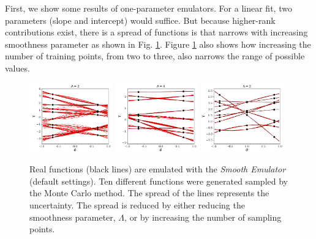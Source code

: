 \documentclass[UserManual.tex]{subfiles}
\begin{document}
First, we show some results of one-parameter emulators. For a linear fit, two parameters (slope and intercept) would suffice. But because higher-rank contributions exist, there is a spread of functions is that narrows with increasing smoothness parameter as shown in Fig. \ref{fig:onedim}. Figure \ref{fig:onedim} also shows how increasing the number of training points, from two to three, also narrows the range of possible values. 
\begin{figure}
\includegraphics[width=0.32\textwidth]{onepar2points/onepartest_Lambda2}\hspace*{0.02\textwidth}
\includegraphics[width=0.32\textwidth]{onepar2points/onepartest_Lambda4}\hspace*{0.02\textwidth}
\includegraphics[width=0.32\textwidth]{onepar3points/onepartest_Lambda2}
\caption{\label{fig:onedim}
Real functions (black lines) are emulated with the {\it Smooth Emulator} (default settings). Ten different functions were generated sampled by the Monte Carlo method. The spread of the lines represents the uncertainty. The spread is reduced by either reducing the smoothness parameter, $\Lambda$, or by increasing the number of sampling points.}
\end{figure}
\end{document}
